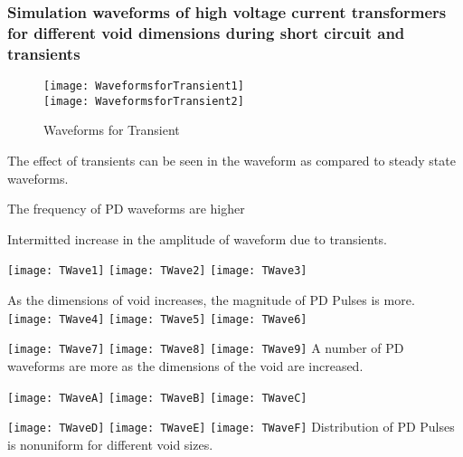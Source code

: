 \subsubsection{Simulation waveforms of high voltage current transformers for different void dimensions during short circuit and transients}

\begin{figure}[h!]
    \centering
    \texttt{[image: WaveformsforTransient1]}\\
    \vspace{1cm}
    \texttt{[image: WaveformsforTransient2]}
    \caption{Waveforms for Transient}
    \label{fig:Waveforms for Transient}
\end{figure}

The effect of transients can be seen in the waveform as compared to steady state waveforms.

The frequency of PD waveforms are higher

Intermitted increase in the amplitude of waveform due to transients. 

\pagebreak
\begin{center}
\texttt{[image: TWave1]}
\vfill
\texttt{[image: TWave2]}
\vfill
\texttt{[image: TWave3]}
\end{center}


\pagebreak
\begin{center}
As the dimensions of void increases, the magnitude of PD Pulses is more.
\texttt{[image: TWave4]}
\vfill
\texttt{[image: TWave5]}
\vfill
\texttt{[image: TWave6]}
\end{center}

\pagebreak
\begin{center}
\texttt{[image: TWave7]}
\vfill
\texttt{[image: TWave8]}
\vfill
\texttt{[image: TWave9]}
\vfill
A number of PD waveforms are more as the dimensions of the void are increased. 
\end{center}

\pagebreak
\begin{center}
\texttt{[image: TWaveA]}
\vfill
\texttt{[image: TWaveB]}
\vfill
\texttt{[image: TWaveC]}
\end{center}

\pagebreak
\begin{center}
\texttt{[image: TWaveD]}
\vfill
\texttt{[image: TWaveE]}
\vfill
\texttt{[image: TWaveF]}
\vfill
Distribution of PD Pulses is nonuniform for different void sizes.
\end{center}

